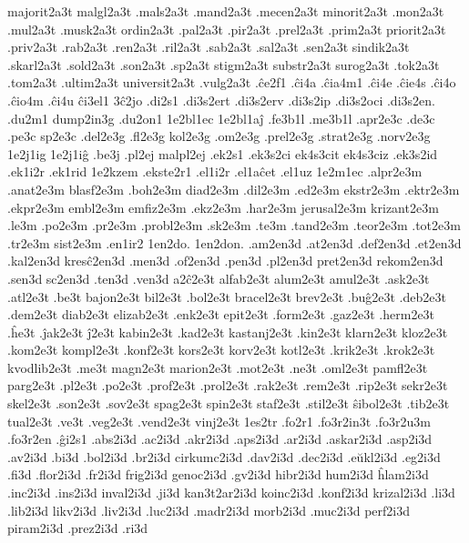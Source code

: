 {majorit2a3t malgl2a3t .mals2a3t .mand2a3t .mecen2a3t minorit2a3t .mon2a3t
.mul2a3t .musk2a3t ordin2a3t .pal2a3t .pir2a3t .prel2a3t .prim2a3t
priorit2a3t .priv2a3t .rab2a3t .ren2a3t .ril2a3t .sab2a3t .sal2a3t
.sen2a3t sindik2a3t .skarl2a3t .sold2a3t .son2a3t .sp2a3t stigm2a3t
substr2a3t surog2a3t .tok2a3t .tom2a3t .ultim2a3t universit2a3t .vulg2a3t
.ĉe2f1
.ĉi4a .ĉia4m1 .ĉi4e .ĉie4s .ĉi4o .ĉio4m .ĉi4u
ĉi3el1
3ĉ2jo
.di2s1
.di3s2ert .di3s2erv .di3s2ip .di3s2oci
 .di3s2en.
.du2m1
dump2in3g
.du2on1
  1e2bl1ec 1e2bl1aĵ
.fe3b1l .me3b1l
.apr2e3c .de3c .pe3c sp2e3c
 
.del2e3g .fl2e3g kol2e3g .om2e3g .prel2e3g .strat2e3g .norv2e3g
 1e2j1ig 1e2j1iĝ
.be3j .pl2ej malpl2ej
.ek2s1 .ek3s2ci ek4s3cit ek4s3ciz .ek3s2id .ek1i2r .ek1rid
1e2kzem
.ekste2r1
 
.el1i2r .el1aĉet .el1uz
  1e2m1ec
.alpr2e3m .anat2e3m blasf2e3m .boh2e3m diad2e3m .dil2e3m .ed2e3m ekstr2e3m
.ektr2e3m .ekpr2e3m embl2e3m emfiz2e3m .ekz2e3m .har2e3m jerusal2e3m
krizant2e3m .le3m .po2e3m .pr2e3m .probl2e3m .sk2e3m .te3m .tand2e3m .teor2e3m
.tot2e3m .tr2e3m sist2e3m
.en1ir2
  1en2do. 1en2don.
.am2en3d .at2en3d .def2en3d .et2en3d .kal2en3d kresĉ2en3d .men3d .of2en3d
.pen3d .pl2en3d pret2en3d rekom2en3d .sen3d sc2en3d .ten3d .ven3d
 
a2ĉ2e3t alfab2e3t alum2e3t amul2e3t .ask2e3t .atl2e3t .be3t
bajon2e3t bil2e3t .bol2e3t bracel2e3t brev2e3t .buĝ2e3t .deb2e3t .dem2e3t
diab2e3t elizab2e3t .enk2e3t epit2e3t .form2e3t .gaz2e3t .herm2e3t .ĥe3t
.ĵak2e3t ĵ2e3t kabin2e3t .kad2e3t kastanj2e3t .kin2e3t klarn2e3t
kloz2e3t .kom2e3t kompl2e3t .konf2e3t kors2e3t korv2e3t kotl2e3t .krik2e3t
.krok2e3t kvodlib2e3t .me3t magn2e3t marion2e3t .mot2e3t .ne3t .oml2e3t
pamfl2e3t parg2e3t .pl2e3t .po2e3t .prof2e3t .prol2e3t .rak2e3t .rem2e3t
.rip2e3t sekr2e3t skel2e3t .son2e3t .sov2e3t spag2e3t spin2e3t staf2e3t
.stil2e3t ŝibol2e3t .tib2e3t tual2e3t .ve3t .veg2e3t .vend2e3t vinj2e3t
%
1es2tr
.fo2r1
.fo3r2in3t .fo3r2u3m
 .fo3r2en 
.ĝi2s1
.abs2i3d .ac2i3d .akr2i3d .aps2i3d .ar2i3d .askar2i3d .asp2i3d .av2i3d
.bi3d .bol2i3d .br2i3d cirkumc2i3d .dav2i3d .dec2i3d .eŭkl2i3d
.eg2i3d .fi3d .flor2i3d .fr2i3d frig2i3d genoc2i3d .gv2i3d hibr2i3d
hum2i3d ĥlam2i3d .inc2i3d .ins2i3d inval2i3d .ji3d kan3t2ar2i3d koinc2i3d
.konf2i3d krizal2i3d .li3d .lib2i3d likv2i3d .liv2i3d .luc2i3d
.madr2i3d morb2i3d .muc2i3d perf2i3d piram2i3d .prez2i3d .ri3d
}
